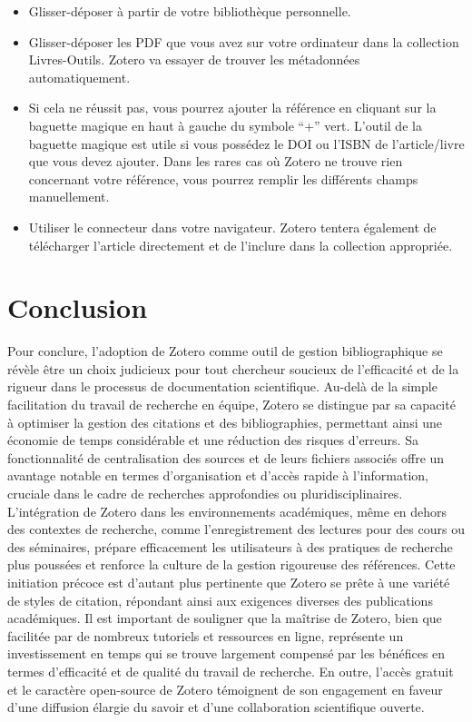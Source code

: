 \documentclass[
  letterpaper,
]{scrbook}
\providecommand{\tightlist}{%
  \setlength{\itemsep}{0pt}\setlength{\parskip}{0pt}}\usepackage{longtable,booktabs,array}
\begin{document}
\begin{itemize}
\tightlist
\item
  Glisser-déposer à partir de votre bibliothèque personnelle.
\item
  Glisser-déposer les PDF que vous avez sur votre ordinateur dans la
  collection Livres-Outils. Zotero va essayer de trouver les métadonnées
  automatiquement.
\item
  Si cela ne réussit pas, vous pourrez ajouter la référence en cliquant
  sur la baguette magique en haut à gauche du symbole ``+'' vert.
  L'outil de la baguette magique est utile si vous possédez le DOI ou
  l'ISBN de l'article/livre que vous devez ajouter. Dans les rares cas
  où Zotero ne trouve rien concernant votre référence, vous pourrez
  remplir les différents champs manuellement.
\item
  Utiliser le connecteur dans votre navigateur. Zotero tentera également
  de télécharger l'article directement et de l'inclure dans la
  collection appropriée.
\end{itemize}

\hypertarget{conclusion-3}{%
\section{Conclusion}\label{conclusion-3}}

Pour conclure, l'adoption de Zotero comme outil de gestion
bibliographique se révèle être un choix judicieux pour tout chercheur
soucieux de l'efficacité et de la rigueur dans le processus de
documentation scientifique. Au-delà de la simple facilitation du travail
de recherche en équipe, Zotero se distingue par sa capacité à optimiser
la gestion des citations et des bibliographies, permettant ainsi une
économie de temps considérable et une réduction des risques d'erreurs.
Sa fonctionnalité de centralisation des sources et de leurs fichiers
associés offre un avantage notable en termes d'organisation et d'accès
rapide à l'information, cruciale dans le cadre de recherches
approfondies ou pluridisciplinaires. L'intégration de Zotero dans les
environnements académiques, même en dehors des contextes de recherche,
comme l'enregistrement des lectures pour des cours ou des séminaires,
prépare efficacement les utilisateurs à des pratiques de recherche plus
poussées et renforce la culture de la gestion rigoureuse des références.
Cette initiation précoce est d'autant plus pertinente que Zotero se
prête à une variété de styles de citation, répondant ainsi aux exigences
diverses des publications académiques. Il est important de souligner que
la maîtrise de Zotero, bien que facilitée par de nombreux tutoriels et
ressources en ligne, représente un investissement en temps qui se trouve
largement compensé par les bénéfices en termes d'efficacité et de
qualité du travail de recherche. En outre, l'accès gratuit et le
caractère open-source de Zotero témoignent de son engagement en faveur
d'une diffusion élargie du savoir et d'une collaboration scientifique
ouverte.
\end{document}
